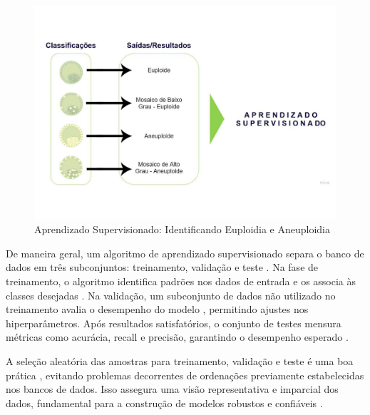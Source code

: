 \begin{figure}[h]
    \captionsetup{font=footnotesize, position=above}
    \label{fig:biopsiaPGT-A}
    \centering
    \includegraphics[scale=0.35]{figuras/aprendizadoSuper.pdf}
    \vspace{0.3cm} 
    \caption{Aprendizado Supervisionado: Identificando Euploidia e Aneuploidia}
\end{figure}
\FloatBarrier

De maneira geral, um algoritmo de aprendizado supervisionado separa o banco de dados em três subconjuntos: treinamento, validação e teste \cite{izbicki2020}. Na fase de treinamento, o algoritmo identifica padrões nos dados de entrada e os associa às classes desejadas \cite{izbicki2020}. Na validação, um subconjunto de dados não utilizado no treinamento avalia o desempenho do modelo \cite{izbicki2020}, permitindo ajustes nos hiperparâmetros. Após resultados satisfatórios, o conjunto de testes mensura métricas como acurácia, recall e precisão, garantindo o desempenho esperado \cite{izbicki2020}.

A seleção aleatória das amostras para treinamento, validação e teste é uma boa prática \cite{izbicki2020}, evitando problemas decorrentes de ordenações previamente estabelecidas nos bancos de dados. Isso assegura uma visão representativa e imparcial dos dados, fundamental para a construção de modelos robustos e confiáveis \cite{izbicki2020}. 

